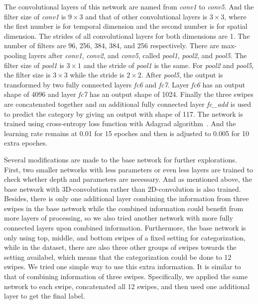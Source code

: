 The convolutional layers of this network are named from \textit{conv1} to \textit{conv5}.
And the filter size of \textit{conv1} is $9\times3$ and that of other convolutional layers is $3\times3$, where the first number is for temporal dimension and the second number is for spatial dimension.
The strides of all convolutional layers for both dimensions are 1. The number of filters are 96, 256, 384, 384, and 256 respectively.
There are max-pooling layers after \textit{conv1}, \textit{conv2}, and \textit{conv5}, called \textit{pool1}, \textit{pool2}, and \textit{pool5}. The filter size of \textit{pool1} is $3\times1$ and the stride of \textit{pool1} is the same.
For \textit{pool2} and \textit{pool5}, the filter size is $3\times3$ while the stride is $2\times2$.
After \textit{pool5}, the output is transformed by two fully connected layers \textit{fc6} and \textit{fc7}. Layer \textit{fc6} has an output shape of 4096 and layer \textit{fc7} has an output shape of 1024.
Finally the three swipes are concatenated together and an additional fully connected layer \textit{fc\_add} is used to predict the category by giving an output with shape of 117.
The network is trained using cross-entropy loss function with Adagrad algorithm~\cite{duchi2011adaptive}.
And the learning rate remains at 0.01 for 15 epoches and then is adjusted to 0.005 for 10 extra epoches.


Several modifications are made to the base network for further explorations. First, two smaller networks with less parameters or even less layers are trained to check whether depth and parameters are necessary.
And as mentioned above, the base network with 3D-convolution rather than 2D-convolution is also trained.
Besides, there is only one additional layer combining the information from three swipes in the base network while the combined information could benefit from more layers of processing, so we also tried another network with more fully connected layers upon combined information.
Furthermore, the base network is only using top, middle, and bottom swipes of a fixed setting for categorization, while in the dataset, there are also three other groups of swipes towards the setting availabel, which means that the categorization could be done to 12 swipes. 
We tried one simple way to use this extra information. It is similar to that of combining information of three swipes. Specifically, we applied the same network to each swipe, concatenated all 12 swipes, and then used one additional layer to get the final label.
